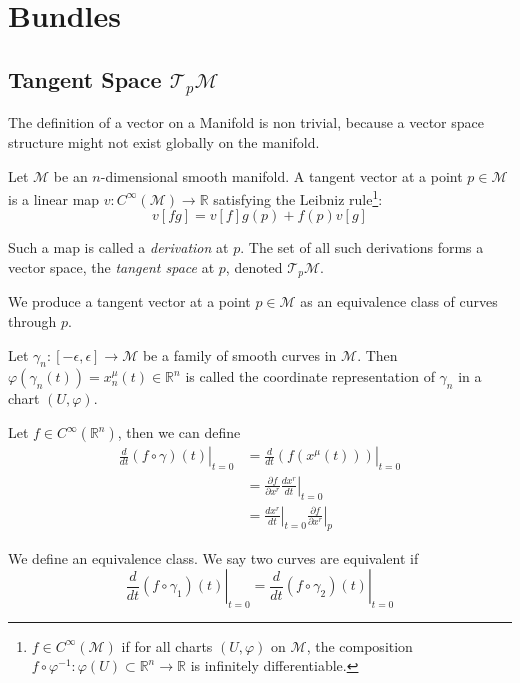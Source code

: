 
\chapter{Bundles}


\section{Tangent Space $\mathcal{T}_p\mathcal{M}$}

  The definition of a vector on a Manifold is non trivial, because a vector space structure might not exist globally on the manifold.

  Let $\mathcal{M}$ be an $n$-dimensional smooth manifold. A tangent vector at a point $p \in \mathcal{M}$ is a linear map $v: C^\infty(\mathcal{M}) \to \mathbb{R}$ satisfying the Leibniz rule\footnote{$f \in C^\infty(\mathcal{M})$ if for all charts $(U, \varphi)$ on $\mathcal{M}$, the composition $f \circ \varphi^{-1}: \varphi(U) \subset \mathbb{R}^n \to \mathbb{R}$ is infinitely differentiable.}:
  \[ v[fg] = v[f]g(p) + f(p)v[g] \]
  
  Such a map is called a \textit{derivation} at $p$. The set of all such derivations forms a vector space, the \textit{tangent space} at $p$, denoted $\mathcal{T}_p\mathcal{M}$.

  We produce a tangent vector at a point $p \in \mathcal{M}$ as an equivalence class of curves through $p$.

  Let $\gamma_n: [-\epsilon, \epsilon] \to \mathcal{M}$ be a family of smooth curves in $\mathcal{M}$. Then $\varphi(\gamma_n(t)) = x_n^\mu(t) \in \mathbb{R}^n$ is called the coordinate representation of $\gamma_n$ in a chart $(U, \varphi)$.

Let $f \in C^\infty(\mathbb{R}^n)$, then we can define
\begin{align*}
\left. \frac{d}{dt} (f \circ \gamma)(t) \right|_{t=0}
&= \left. \frac{d}{dt} \left( f(x^\mu(t)) \right) \right|_{t=0} \\
&= \left. \frac{\partial f}{\partial x^r} \frac{d x^r}{dt} \right|_{t=0} \\
&= \left. \frac{d x^r}{dt} \right|_{t=0} \left. \frac{\partial f}{\partial x^r} \right|_p
\end{align*}

We define an equivalence class.  
We say two curves are equivalent  
if
\[
\left. \frac{d}{dt} \left( f \circ \gamma_1 \right)(t) \right|_{t=0}
= \left. \frac{d}{dt} \left( f \circ \gamma_2 \right)(t) \right|_{t=0}
\]

